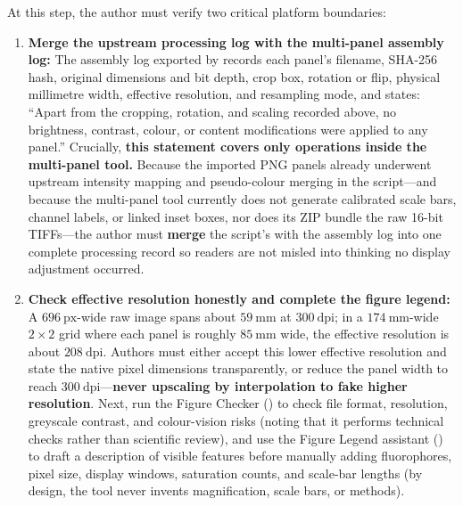 At this step, the author must verify two critical platform boundaries:
\begin{enumerate}
\item \textbf{Merge the upstream processing log with the multi-panel assembly log:} The assembly log exported by  records each panel's filename, SHA-256 hash, original dimensions and bit depth, crop box, rotation or flip, physical millimetre width, effective resolution, and resampling mode, and states: ``Apart from the cropping, rotation, and scaling recorded above, no brightness, contrast, colour, or content modifications were applied to any panel.'' Crucially, \textbf{this statement covers only operations inside the multi-panel tool.} Because the imported PNG panels already underwent upstream intensity mapping and pseudo-colour merging in the script---and because the multi-panel tool currently does not generate calibrated scale bars, channel labels, or linked inset boxes, nor does its ZIP bundle the raw 16-bit TIFFs---the author must \textbf{merge} the script's  with the assembly log into one complete processing record so readers are not misled into thinking no display adjustment occurred.
\item \textbf{Check effective resolution honestly and complete the figure legend:} A $696\ \text{px}$-wide raw image spans about $59\ \text{mm}$ at $300\ \text{dpi}$; in a $174\ \text{mm}$-wide $2 \times 2$ grid where each panel is roughly $85\ \text{mm}$ wide, the effective resolution is about $208\ \text{dpi}$. Authors must either accept this lower effective resolution and state the native pixel dimensions transparently, or reduce the panel width to reach $300\ \text{dpi}$---\textbf{never upscaling by interpolation to fake higher resolution}. Next, run the Figure Checker () to check file format, resolution, greyscale contrast, and colour-vision risks (noting that it performs technical checks rather than scientific review), and use the Figure Legend assistant () to draft a description of visible features before manually adding fluorophores, pixel size, display windows, saturation counts, and scale-bar lengths (by design, the tool never invents magnification, scale bars, or methods).
\end{enumerate}

